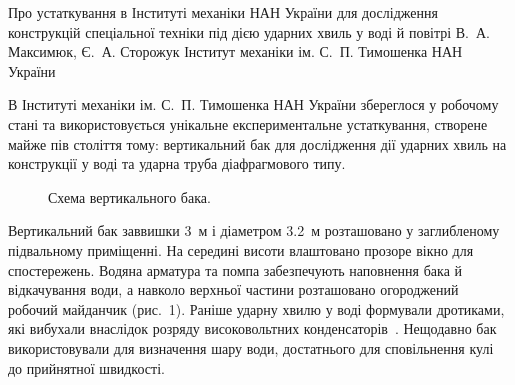 \ReportHeading
  {Про устаткування в Інституті механіки НАН України для дослідження конструкцій спеціальної техніки під дією ударних хвиль у воді й повітрі}
  {В.~А. Максимюк, Є.~А. Сторожук}
  {Інститут механіки ім. С.~П. Тимошенка НАН України}
  {}

В Інституті механіки ім. С.~П. Тимошенка НАН України збереглося у робочому стані та використовується унікальне експериментальне устаткування, створене майже пів століття тому: вертикальний бак для дослідження дії ударних хвиль на конструкції у воді та ударна труба діафрагмового типу.

\begin{figure}
  \vspace{-0.6\baselineskip}
  \centering
  \caption{Схема вертикального бака.}
  \vspace{-0.5\baselineskip}
\end{figure}

Вертикальний бак заввишки 3~м і діаметром 3.2~м розташовано у заглибленому підвальному приміщенні. На середині висоти влаштовано прозоре вікно для спостережень. Водяна арматура та помпа забезпечують наповнення бака й відкачування води, а навколо верхньої частини розташовано огороджений робочий майданчик (рис.~1). Раніше ударну хвилю у воді формували дротиками, які вибухали внаслідок розряду високовольтних конденсаторів~\cite{equipment:anikiev1999}. Нещодавно бак використовували для визначення шару води, достатнього для сповільнення кулі до прийнятної швидкості.

